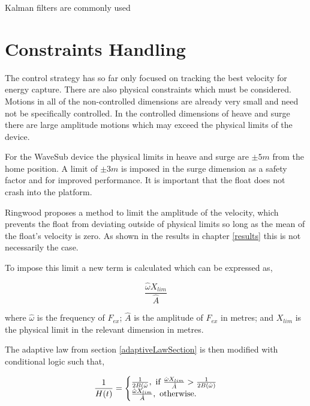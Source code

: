 \documentclass{report}
\begin{document}
Kalman filters are commonly used 

\begin{figure}
\label{kalmanAmplitudeEnvelope}
\caption{}
\end{figure} 

\begin{figure}
\label{kalmanFrequency}
\caption{}
\end{figure} 


\section{Constraints Handling}
\label{constraintsHandlingSection}
The control strategy has so far only focused on tracking the best velocity for energy capture. There are also physical constraints which must be considered. Motions in all of the non-controlled dimensions are already very small and  need not be specifically controlled. In the controlled dimensions of heave and surge there are large amplitude motions which may exceed the physical limits of the device.

For the WaveSub device the physical limits in heave and surge are $\pm 5m$ from the home position. A limit of $\pm 3m$ is imposed in the surge dimension as a safety factor and for improved performance. It is important that the float does not crash into the platform.

Ringwood \cite{ringwood} proposes a method to limit the amplitude of the velocity, which prevents the float from deviating outside of physical limits so long as the mean of the float's velocity is zero. As shown in the results in chapter \ref{results} this is not necessarily the case.

To impose this limit a new term is calculated which can be expressed as, 

\[
\frac{\hat{\omega}X_{lim}}{\hat{A}}
\]

where $\hat{\omega}$ is the frequency of $F_{ex}$; $\hat{A}$ is the amplitude of $F_{ex}$ in metres; and $X_{lim}$ is the physical limit in the relevant dimension in metres.

The adaptive law from section \ref{adaptiveLawSection} is then modified with conditional logic such that,

\[
\frac{1}{H(t)} = 
\left\{\begin{matrix*}[l]
\frac{1}{2B(\hat{\omega}}, \textup{ if } \frac{\hat{\omega}X_{lim}}{\hat{A}}>\frac{1}{2B(\hat{\omega})}\\
\frac{\hat{\omega}X_{lim}}{\hat{A}}, \textup{ otherwise.}\\
\end{matrix*}\right.
\]
\end{document}
